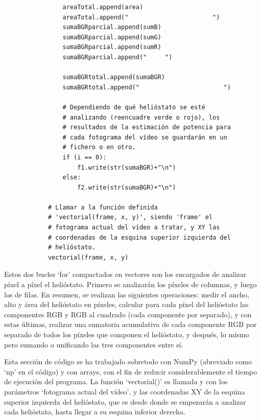 \begin{lstlisting}
                areaTotal.append(area)
                areaTotal.append("                       ")
                sumaBGRparcial.append(sumB)
                sumaBGRparcial.append(sumG)
                sumaBGRparcial.append(sumR)
                sumaBGRparcial.append("     ")
                
                sumaBGRtotal.append(sumaBGR)
                sumaBGRtotal.append("                       ")
                
                # Dependiendo de qué helióstato se esté
                # analizando (reencuadre verde o rojo), los
                # resultados de la estimación de potencia para
                # cada fotograma del vídeo se guardarán en un
                # fichero o en otro.
                if (i == 0):
                    f1.write(str(sumaBGR)+"\n")  
                else:
                    f2.write(str(sumaBGR)+"\n")

            # Llamar a la función definida
            # 'vectorial(frame, x, y)', siendo 'frame' el
            # fotograma actual del vídeo a tratar, y XY las
            # coordenadas de la esquina superior izquierda del
            # helióstato.
            vectorial(frame, x, y)
\end{lstlisting}
        
Estos dos bucles ‘for’ compactados en vectores son los encargados de analizar píxel a píxel el helióstato. Primero se analizarán los píxeles de columnas, y luego los de filas. En resumen, se realizan las siguientes operaciones: medir el ancho, alto y área del helióstato en píxeles, calcular para cada píxel del helióstato las componentes RGB y RGB al cuadrado (cada componente por separado), y con estas últimas, realizar una sumatoria acumulativa de cada componente RGB por separado de todos los píxeles que componen el helióstato, y después, lo mismo pero sumando o unificando las tres componentes entre sí.

Esta sección de código se ha trabajado sobretodo con NumPy (abreviado como ‘np’ en el código) y con arrays, con el fin de reducir considerablemente el tiempo de ejecución del programa. La función ‘vectorial()’ es llamada y con los parámetros ‘fotograma actual del vídeo’, y las coordenadas XY de la esquina superior izquierda del helióstato, que es desde donde se empezarán a analizar cada helióstato, hasta llegar a su esquina inferior derecha.


